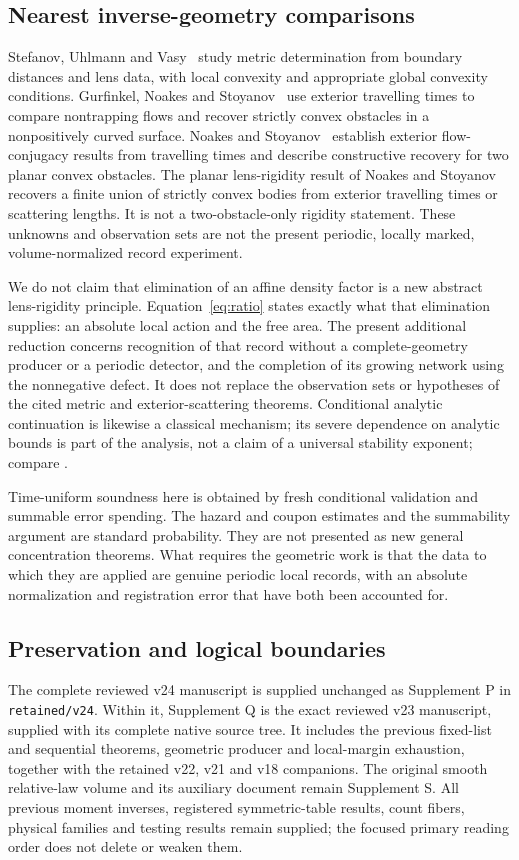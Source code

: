 \subsection{Nearest inverse-geometry comparisons}
Stefanov, Uhlmann and Vasy~\cite{SUV} study metric determination from
boundary distances and lens data, with local convexity and appropriate
global convexity conditions. Gurfinkel, Noakes and Stoyanov~\cite{GNS}
use exterior travelling times to compare nontrapping flows and recover
strictly convex obstacles in a nonpositively curved surface. Noakes and
Stoyanov~\cite{NS} establish exterior flow-conjugacy results from travelling
times and describe constructive recovery for two planar convex obstacles.
The planar lens-rigidity result of Noakes and Stoyanov~\cite{NSlens}
recovers a finite union of strictly convex bodies from exterior travelling
times or scattering lengths. It is not a two-obstacle-only rigidity
statement. These unknowns and observation sets are not the present
periodic, locally marked, volume-normalized record experiment.

We do not claim that elimination of an affine density factor is a new
abstract lens-rigidity principle. Equation~\eqref{eq:ratio} states exactly
what that elimination supplies: an absolute local action and the free
area. The present additional reduction concerns recognition of that
record without a complete-geometry producer or a periodic detector,
and the completion of its growing network using the nonnegative defect.
It does not replace the observation sets or hypotheses of the cited
metric and exterior-scattering theorems. Conditional analytic continuation
is likewise a classical mechanism; its severe dependence on analytic
bounds is part of the analysis, not a claim of a universal stability
exponent; compare \cite{Trefethen}.

Time-uniform soundness here is obtained by fresh conditional validation
and summable error spending. The hazard and coupon estimates and the
summability argument are standard probability. They are not presented
as new general concentration theorems. What requires the geometric work
is that the data to which they are applied are genuine periodic local
records, with an absolute normalization and registration error that have
both been accounted for.

\subsection{Preservation and logical boundaries}
The complete reviewed v24 manuscript is supplied unchanged as Supplement P
in \texttt{retained/v24}. Within it, Supplement Q is the exact reviewed
v23 manuscript, supplied with its
complete native source tree. It includes the previous fixed-list and
sequential theorems, geometric producer and local-margin exhaustion,
together with the retained v22, v21 and v18 companions. The original
smooth relative-law volume and its auxiliary document remain Supplement S.
All previous moment inverses, registered symmetric-table results, count
fibers, physical families and testing results remain supplied; the focused
primary reading order does not delete or weaken them.


